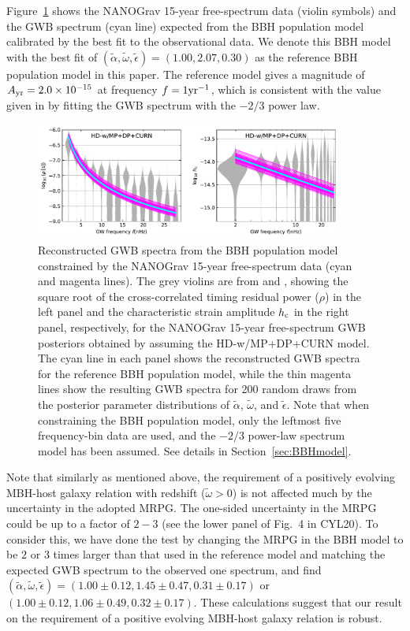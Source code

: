 \documentclass[twocolumn]{aastex631}
\newcommand{\talpha}{{\tilde{\alpha}}}
\newcommand{\tomega}{{\tilde{\omega}}}
\newcommand{\tepsilon}{{\tilde{\epsilon}}}
\newcommand{\rmc}{_{\rm c}}
\begin{document}
Figure~\ref{fig:GWBConstraint} shows the NANOGrav 15-year free-spectrum data
(violin symbols) \citep{NG23hd, NG23constraint} and the GWB spectrum (cyan line)
expected from the BBH population model calibrated by the best fit to the
observational data. We denote this BBH model with the best fit of
$(\tilde{\alpha}, \tomega, \tilde{\epsilon})=(1.00, 2.07, 0.30)$ as the
reference BBH population model in this paper. The reference model gives a
magnitude of $A_{\rm yr}=2.0\times 10^{-15}$ at frequency $f=1{\rm yr}^{-1}$,
which is consistent with the value given in \citet[][]{NG23constraint} by
fitting the GWB spectrum with the $-2/3$ power law.

\begin{figure} 
%
\centering
%
\includegraphics[width=0.9\textwidth]{f1.pdf}
%
\caption{Reconstructed GWB spectra from the BBH population model constrained by
the NANOGrav 15-year free-spectrum data (cyan and magenta lines). The grey
violins are from \citet{NG23hd} and \cite{NG23constraint}, showing the square
root of the cross-correlated timing residual power ($\rho$) in the left panel
and the characteristic strain amplitude $h\rmc$ in the right panel,
respectively, for the NANOGrav 15-year free-spectrum GWB posteriors obtained by
assuming the HD-w/MP+DP+CURN model. The cyan line in each panel shows the
reconstructed GWB spectra for the reference BBH population model, while the thin
magenta lines show the resulting GWB spectra for 200 random draws from the
posterior parameter distributions of $\talpha$, $\tomega$, and $\tepsilon$. Note
that when constraining the BBH population model, only the leftmost five
frequency-bin data are used, and the $-2/3$ power-law spectrum model has been
assumed. See details in Section~\ref{sec:BBHmodel}.}
%
\label{fig:GWBConstraint}
%
\end{figure}

Note that similarly as mentioned above, the requirement of a positively
evolving MBH-host galaxy relation with redshift ($\tomega>0$) is not affected
much by the uncertainty in the adopted MRPG. 
%
The one-sided uncertainty in the MRPG could be up to a factor of $2-3$
(see the lower panel of Fig.~4 in CYL20).
%
To consider this, we have done the test by changing the MRPG in the BBH model
to be $2$ or $3$ times larger than that used in the reference model and
matching the expected GWB spectrum to the observed one spectrum, and find
$(\talpha, \tomega, \tepsilon) = (1.00\pm 0.12, 1.45\pm 0.47, 0.31\pm 0.17)$ or
$(1.00\pm 0.12, 1.06\pm 0.49, 0.32\pm 0.17)$. These calculations suggest that
our result on the requirement of a positive evolving MBH-host galaxy relation
is robust. 
\end{document}
